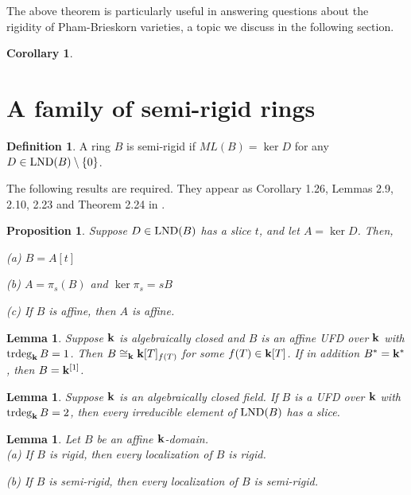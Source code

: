 \documentclass[12pt]{amsart}
\theoremstyle{plain}
\newtheorem{proposition}[subsection]{Proposition}
\newtheorem{lemma}[subsection]{Lemma}
\newtheorem{corollary}[subsection]{Corollary}
\theoremstyle{definition}
\newtheorem{definition}[subsection]{Definition}
\newcommand{\trdeg}{	\operatorname{{\rm trdeg}}}
\newcommand{\bk}{{\ensuremath{\rm \bf k}}}
\newcommand{\lnd}{\operatorname{{\rm LND}}}
\newcommand{\isom}{\cong}
\begin{document}
The above theorem is particularly useful in answering questions about the rigidity of Pham-Brieskorn varieties, a topic we discuss in the following section. 

\begin{corollary}
	
\end{corollary}

\section{A family of semi-rigid rings}

\begin{definition}
	A ring $B$ is semi-rigid if $ML(B) = \ker D$ for any $D \in \lnd(B) \setminus\{0\}$. 
\end{definition}

The following results are required. They appear as Corollary 1.26, Lemmas 2.9, 2.10, 2.23 and Theorem 2.24 in \cite{freudenburg2017algebraic}.

\begin{proposition}\label{sliceTheorem}
	Suppose $D \in \lnd(B)$ has a slice $t$, and let $A = \ker D$. Then,
	
	(a) $B = A[t]$
	
	(b) $A = \pi_s(B)$ and $\ker \pi_s = sB$
	
	(c) If $B$ is affine, then $A$ is affine. 
	
\end{proposition}

\begin{lemma} \label{FV2-2.9}
	Suppose $\bk$ is algebraically closed and $B$ is an affine UFD over $\bk$ with $\trdeg_\bk B = 1$. Then $B \isom_\bk \bk[T]_{f(T)}$ for some $f(T) \in \bk[T]$. If in addition $B^* = \bk^*$, then $B = \bk^{[1]}$. 
\end{lemma}


\begin{lemma}\label{FV2-2.10}
	Suppose $\bk$ is an algebraically closed field. If $B$ is a UFD over $\bk$ with $\trdeg_\bk B = 2$, then every irreducible element of $\lnd(B)$ has a slice. 
\end{lemma}

\begin{lemma} \label{rigidLocalization}
	Let $B$ be an affine $\bk$-domain. 
	\\
	
	(a) If $B$ is rigid, then every localization of $B$ is rigid. 
	
	(b) If $B$ is semi-rigid, then every localization of $B$ is semi-rigid. 
\end{lemma}
\end{document}
